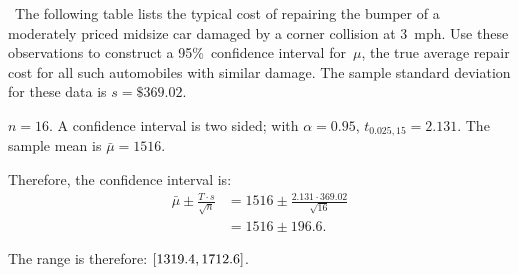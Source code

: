 \begin{problem}
  ~The following table lists the typical cost of repairing the bumper of a moderately priced midsize car damaged by a corner collision at 3~mph.  Use these observations to construct a 95\%~confidence interval for~$\mu$, the true average repair cost for all such automobiles with similar damage.  The sample standard deviation for these data is ${s = \$369.02}$.
\end{problem}

${n = 16}$. A confidence interval is two sided; with ${\alpha = 0.95}$, ${t_{0.025,15} = 2.131}$.  The sample mean is ${\bar{\mu} = 1516}$.

Therefore, the confidence interval is:
\begin{align}
  \bar{\mu} \pm \frac{T \cdot s}{\sqrt{n}} &= 1516 \pm \frac{2.131 \cdot 369.02}{\sqrt{16}} \\
                                           &= 1516 \pm 196.6 \text{.}
\end{align}

The range is therefore: $\lbrack1319.4,1712.6\rbrack$.
